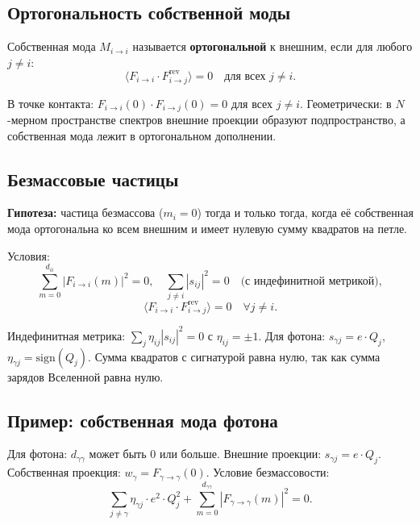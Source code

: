 \documentclass[12pt,a4paper]{article}
\begin{document}
\subsection{Ортогональность собственной моды}
Собственная мода $M_{i \to i}$ называется \textbf{ортогональной} к внешним, если для любого $j \neq i$:
\begin{equation}
    \langle F_{i \to i} \cdot F_{i \to j}^{\text{rev}} \rangle = 0 \quad \text{для всех } j \neq i.
\end{equation}

В точке контакта: $F_{i \to i}(0) \cdot F_{i \to j}(0) = 0$ для всех $j \neq i$. Геометрически: в $N$-мерном пространстве спектров внешние проекции образуют подпространство, а собственная мода лежит в ортогональном дополнении.

\subsection{Безмассовые частицы}
\textbf{Гипотеза:} частица безмассова ($m_i = 0$) тогда и только тогда, когда её собственная мода ортогональна ко всем внешним и имеет нулевую сумму квадратов на петле.

Условия:
\begin{equation}
    \sum_{m=0}^{d_{ii}} |F_{i \to i}(m)|^2 = 0, \quad
    \sum_{j \neq i} |s_{ij}|^2 = 0 \quad \text{(с индефинитной метрикой)},
\end{equation}
\begin{equation}
    \langle F_{i \to i} \cdot F_{i \to j}^{\text{rev}} \rangle = 0 \quad \forall j \neq i.
\end{equation}

Индефинитная метрика: $\sum_j \eta_{ij} |s_{ij}|^2 = 0$ с $\eta_{ij} = \pm 1$. Для фотона: $s_{\gamma j} = e \cdot Q_j$, $\eta_{\gamma j} = \text{sign}(Q_j)$. Сумма квадратов с сигнатурой равна нулю, так как сумма зарядов Вселенной равна нулю.

\subsection{Пример: собственная мода фотона}
Для фотона: $d_{\gamma\gamma}$ может быть $0$ или больше. Внешние проекции: $s_{\gamma j} = e \cdot Q_j$. Собственная проекция: $w_\gamma = F_{\gamma \to \gamma}(0)$. Условие безмассовости:
\begin{equation}
    \sum_{j \neq \gamma} \eta_{\gamma j} \cdot e^2 \cdot Q_j^2 + \sum_{m=0}^{d_{\gamma\gamma}} |F_{\gamma \to \gamma}(m)|^2 = 0.
\end{equation}
\end{document}
